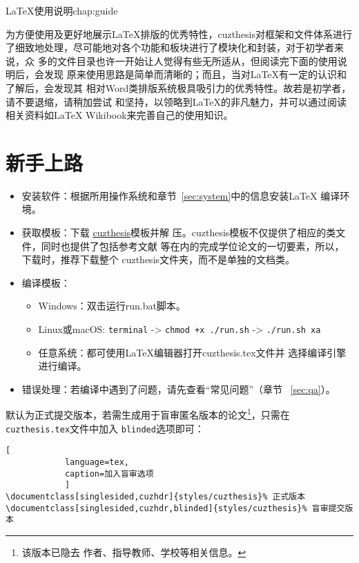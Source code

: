 \begin{cuzchapter}{\LaTeX{}使用说明}{chap:guide}

    为方便使用及更好地展示\LaTeX{}排版的优秀特性，cuzthesis对框架和文件体系进行
    了细致地处理，尽可能地对各个功能和板块进行了模块化和封装，对于初学者来说，众
    多的文件目录也许一开始让人觉得有些无所适从，但阅读完下面的使用说明后，会发现
    原来使用思路是简单而清晰的；而且，当对\LaTeX{}有一定的认识和了解后，会发现其
    相对Word类排版系统极具吸引力的优秀特性。故若是初学者，请不要退缩，请稍加尝试
    和坚持，以领略到\LaTeX{}的非凡魅力，并可以通过阅读相关资料如\LaTeX{}
    Wikibook\citep{wikibook2014latex}来完善自己的使用知识。

    \section{新手上路}\label{sec:newbie}

    \begin{itemize}
        \item 安装软件：根据所用操作系统和章节~\ref{sec:system}中的信息安装\LaTeX{}
              编译环境。
        \item 获取模板：下载
              \href{https://github.com/xiehao/CUZThesis}{cuzthesis}模板并解
              压。cuzthesis模板不仅提供了相应的类文件，同时也提供了包括参考文献
              等在内的完成学位论文的一切要素，所以，下载时，推荐下载整个
              cuzthesis文件夹，而不是单独的文档类。
        \item 编译模板：
              \begin{itemize}
                  \item Windows：双击运行run.bat脚本。
                  \item Linux或macOS: {\small \verb|terminal| -> \verb|chmod +x ./run.sh| -> \verb|./run.sh xa|}
                  \item 任意系统：都可使用\LaTeX{}编辑器打开cuzthesis.tex文件并
                        选择编译引擎进行编译。
              \end{itemize}
        \item 错误处理：若编译中遇到了问题，请先查看“常见问题”（章节
              ~\ref{sec:qa}）。
    \end{itemize}

    默认为正式提交版本，若需生成用于盲审匿名版本的论文\footnote{该版本已隐去
        作者、指导教师、学校等相关信息。}，只需在\texttt{cuzthesis.tex}文件中加入
    \texttt{blinded}选项即可：
    \begin{lstlisting}[
            language=tex,
            caption=加入盲审选项
            ]
\documentclass[singlesided,cuzhdr]{styles/cuzthesis}% 正式版本
\documentclass[singlesided,cuzhdr,blinded]{styles/cuzthesis}% 盲审提交版本
\end{lstlisting}


\end{cuzchapter}
